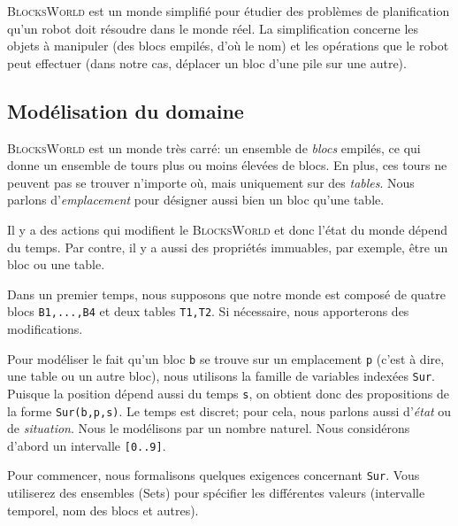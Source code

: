\textsc{BlocksWorld} est un monde simplifié pour étudier des problèmes de
planification qu'un robot doit résoudre dans le monde réel. La simplification
concerne les objets à manipuler (des blocs empilés, d'où le nom) et les
opérations que le robot peut effectuer (dans notre cas, déplacer un bloc d'une
pile sur une autre). 
\subsection{Modélisation du domaine}\label{sec:form_dom}

\textsc{BlocksWorld} est un monde très carré: un ensemble de \emph{blocs} empilés, ce
qui donne un ensemble de tours plus ou moins élevées de blocs. En plus, ces
tours ne peuvent pas se trouver n'importe où, mais uniquement sur des
\emph{tables}. Nous parlons d'\emph{emplacement} pour désigner aussi bien un bloc qu'une table.

Il y a des actions qui modifient le \textsc{BlocksWorld} et donc l'état du monde 
dépend du temps. Par contre, il y a aussi des propriétés immuables, par exemple, être un bloc ou une table.

Dans un premier temps, nous supposons que notre monde est composé de quatre
blocs \texttt{B1,...,B4} et deux tables \texttt{T1,T2}. Si nécessaire, nous apporterons
des modifications. 

Pour modéliser le fait qu'un bloc \texttt{b} se trouve sur un emplacement \texttt{p} (c'est à
dire, une table ou un autre bloc), nous utilisons la famille de variables indexées
\texttt{Sur}. Puisque la position dépend aussi du temps \texttt{s}, on obtient donc
des propositions de la forme \texttt{Sur(b,p,s)}. Le temps est discret; pour cela,
nous parlons aussi d'\emph{état} ou de \emph{situation}. Nous le modélisons par un nombre
naturel. Nous considérons d'abord un intervalle \texttt{[0..9]}.

Pour commencer, nous formalisons quelques exigences concernant \texttt{Sur}. Vous utiliserez des ensembles (Sets) pour spécifier les différentes valeurs (intervalle temporel, nom des blocs et autres). 

